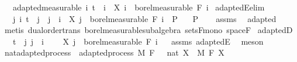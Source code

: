 \begin{isabellebody}
\ \ \ adapted{\isacharbrackleft}{\kern0pt}measurable{\isacharbrackright}{\kern0pt}{\isacharcolon}{\kern0pt}\ {\isachardoublequoteopen}{\isasymAnd}i{\isachardot}{\kern0pt}\ t\ {\isasymle}\ i\ {\isasymLongrightarrow}\ X\ i\ {\isasymin}\ borel{\isacharunderscore}{\kern0pt}measurable\ {\isacharparenleft}{\kern0pt}F\ i{\isacharparenright}{\kern0pt}{\isachardoublequoteclose}\isanewline
{}\isanewline
\isanewline
{}\isamarkupfalse%
\ adaptedE{\isacharbrackleft}{\kern0pt}elim{\isacharbrackright}{\kern0pt}{\isacharcolon}{\kern0pt}\isanewline
\ \ \ {\isachardoublequoteopen}{\isasymlbrakk}{\isasymAnd}j\ i{\isachardot}{\kern0pt}\ t\ {\isasymle}\ j\ {\isasymLongrightarrow}\ j\ {\isasymle}\ i\ {\isasymLongrightarrow}\ X\ j\ {\isasymin}\ borel{\isacharunderscore}{\kern0pt}measurable\ {\isacharparenleft}{\kern0pt}F\ i{\isacharparenright}{\kern0pt}{\isasymrbrakk}\ {\isasymLongrightarrow}\ P{\isachardoublequoteclose}\isanewline
\ \ \ P\isanewline
%
\isadelimproof
\ \ %
\endisadelimproof
%
\isatagproof
{}\isamarkupfalse%
\ assms\ \isamarkupfalse%
\ adapted\ \isamarkupfalse%
\ {\isacharparenleft}{\kern0pt}metis\ dual{\isacharunderscore}{\kern0pt}order{\isachardot}{\kern0pt}trans\ borel{\isacharunderscore}{\kern0pt}measurable{\isacharunderscore}{\kern0pt}subalgebra\ sets{\isacharunderscore}{\kern0pt}F{\isacharunderscore}{\kern0pt}mono\ space{\isacharunderscore}{\kern0pt}F{\isacharparenright}{\kern0pt}%
\endisatagproof
{\isafoldproof}%
%
\isadelimproof
\isanewline
%
\endisadelimproof
\isanewline
{}\isamarkupfalse%
\ adaptedD{\isacharcolon}{\kern0pt}\isanewline
\ \ \ {\isachardoublequoteopen}t\ {\isasymle}\ j{\isachardoublequoteclose}\ {\isachardoublequoteopen}j\ {\isasymle}\ i{\isachardoublequoteclose}\ \isanewline
\ \ \ {\isachardoublequoteopen}X\ j\ {\isasymin}\ borel{\isacharunderscore}{\kern0pt}measurable\ {\isacharparenleft}{\kern0pt}F\ i{\isacharparenright}{\kern0pt}{\isachardoublequoteclose}%
\isadelimproof
\ %
\endisadelimproof
%
\isatagproof
{}\isamarkupfalse%
\ assms\ adaptedE\ \isamarkupfalse%
\ meson%
\endisatagproof
{\isafoldproof}%
%
\isadelimproof
%
\endisadelimproof
\isanewline
\isanewline
{}\isamarkupfalse%
\isanewline
\isanewline
{}\isamarkupfalse%
\ nat{\isacharunderscore}{\kern0pt}adapted{\isacharunderscore}{\kern0pt}process\ {\isacharequal}{\kern0pt}\ adapted{\isacharunderscore}{\kern0pt}process\ M\ F\ {\isachardoublequoteopen}{}\ {\isacharcolon}{\kern0pt}{\isacharcolon}{\kern0pt}\ nat{\isachardoublequoteclose}\ X\ \ M\ F\ X\isanewline

\end{isabellebody}
